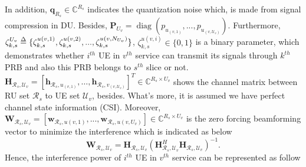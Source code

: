 \documentclass[conference]{IEEEtran}
\def\delequal{\mathrel{\ensurestackMath{\stackon[1pt]{=}{\scriptstyle\Delta}}}}
\newcommand{\diag}{\mathop{\mathrm{diag}}}
\begin{document}
In addition, $\boldsymbol{q}_{R_s} \in \mathbb{C}^{{R}_s }  $ indicates the quantization noise which, is made from signal compression in DU.
Besides, $\boldsymbol{P}_{U_v} = \diag{(p_{u_{(v,1)}}, ..., p_{u_{(v,\mathcal{U}_v)}})}$.
\newline
Furthermore, $\zeta_{k,s}^{U_v} \delequal \{\zeta_{k,s}^{u(v,1)},\zeta_{k,s}^{u(v,2)},...,\zeta_{k,s}^{u(v,N_{U_v})}\}$,
$\zeta_{k,s}^{u(v,i)} \in \{0,1\}$ is a binary parameter, which demonstrates whether $i^{th}$ UE in $v^{th}$ service can transmit its signals through $k^{th}$ PRB and also this PRB belongs to $s^{th}$ slice or not.
$\boldsymbol{H}_{\mathcal{R}_s,\mathcal{U}_v}=\left[\boldsymbol{h}_{\mathcal{R}_s,u_{(v,1)}},\ldots,\boldsymbol{h}_{\mathcal{R}_s,v_{(v,\mathcal{U}_v)}}\right]^T  \in \mathbb{C}^{{R}_s\times {U}_v }$
shows the channel matrix between RU set $\mathcal{R}_s$ to UE set
$\mathcal{U}_v$, besides.
What's more, it is assumed we have perfect channel state information (CSI).\newline
Moreover, $\boldsymbol{W}_{\mathcal{R}_s,\mathcal{U}_v} = [\boldsymbol{w}_{\mathcal{R}_s,u(v,1)},...,\boldsymbol{w}_{\mathcal{R}_s,u(v,U_v)}] \in \mathbb{C}^{{R}_s\times U_v} $ is the zero forcing beamforming vector to minimize the interference which is indicated as below
\begin{equation}
\boldsymbol{W}_{\mathcal{R}_s,\mathcal{U}_v} = \boldsymbol{H}_{\mathcal{R}_s,\mathcal{U}_v}(\boldsymbol{H}_{\mathcal{R}_s,\mathcal{U}_v}^H \boldsymbol{H}_{\mathcal{R}_s,\mathcal{U}_v})^{-1}.
\end{equation}
Hence, the interference power of $i^{th}$ UE in $v^{th}$ service can be represented as follow
\end{document}
